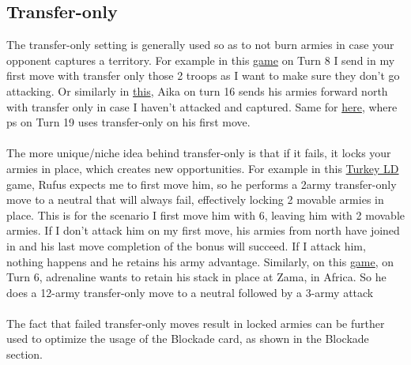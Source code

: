 \subsection{Transfer-only}

The transfer-only setting is generally used so as to not burn armies in case your opponent captures a territory. For example in this \href{https://www.warzone.com/MultiPlayer?GameID=40619054}{game} on Turn 8 I send in my first move with transfer only those 2 troops as I want to make sure they don't go attacking. Or similarly in \href{https://www.warzone.com/MultiPlayer?GameID=39911346}{this}, Aika on turn 16 sends his armies forward north with transfer only in case I haven't attacked and captured. Same for \href{https://www.warzone.com/MultiPlayer?GameID=41380732}{here}, where ps on Turn 19 uses transfer-only on his first move.
\\
\\
The more unique/niche idea behind transfer-only is that if it fails, it locks your armies in place, which creates new opportunities. For example in this \href{https://www.warzone.com/MultiPlayer?GameID=40836522}{Turkey LD} game, Rufus expects me to first move him, so he performs a 2army transfer-only move to a neutral that will always fail, effectively locking 2 movable armies in place. This is for the scenario I first move him with 6, leaving him with 2 movable armies. If I don't attack him on my first move, his armies from north have joined in and his last move completion of the bonus will succeed. If I attack him, nothing happens and he retains his army advantage. Similarly, on this \href{https://www.warzone.com/MultiPlayer?GameID=34661130}{game}, on Turn 6, adrenaline wants to retain his stack in place at Zama, in Africa. So he does a 12-army transfer-only move to a neutral followed by a 3-army attack
\\
\\
The fact that failed transfer-only moves result in locked armies can be further used to optimize the usage of the Blockade card, as shown in the Blockade section.